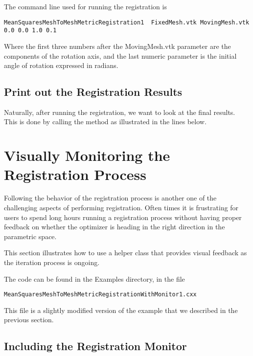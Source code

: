 \documentclass{InsightArticle}
\begin{document}
The command line used for running the registration is

\begin{verbatim} 
MeanSquaresMeshToMeshMetricRegistration1  FixedMesh.vtk MovingMesh.vtk 0.0 0.0 1.0 0.1
\end{verbatim} 

Where the first three numbers after the MovingMesh.vtk parameter are the
components of the rotation axis, and the last numeric parameter is the initial
angle of rotation expressed in radians.


\subsection{Print out the Registration Results}

Naturally, after running the registration, we want to look at the final
results. This is done by calling the  method
as illustrated in the lines below.

\begin{center}

\end{center}


\section{Visually Monitoring the Registration Process}

Following the behavior of the registration process is another one of the
challenging aspects of performing registration. Often times it is frustrating
for users to spend long hours running a registration process without having
proper feedback on whether the optimizer is heading in the right direction in
the parametric space.

This section illustrates how to use a helper class that provides visual
feedback as the iteration process is ongoing.

The code can be found in the Examples directory, in the file

\begin{verbatim} 
MeanSquaresMeshToMeshMetricRegistrationWithMonitor1.cxx
\end{verbatim} 

This file is a slightly modified version of the example that we described in
the previous section.


\subsection{Including the Registration Monitor}
\end{document}
